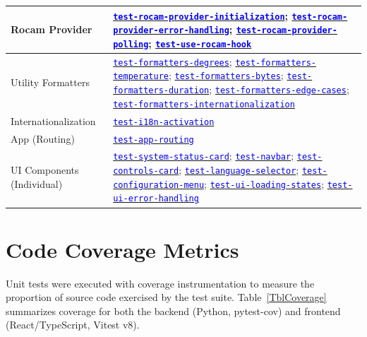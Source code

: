 \documentclass[12pt, titlepage]{article}
\newcommand{\tid}[1]{\hyperlink{tid:#1}{\textcolor{blue}{\texttt{#1}}}}
\begin{document}
\begin{table}[H]
\begin{tabularx}{\textwidth}{|p{4.5cm}|X|}
    \hline
    Rocam Provider             & \tid{test-rocam-provider-initialization}; \tid{test-rocam-provider-error-handling}; \tid{test-rocam-provider-polling}; \tid{test-use-rocam-hook}                                                            \\
    \hline
    Utility Formatters         & \tid{test-formatters-degrees}; \tid{test-formatters-temperature}; \tid{test-formatters-bytes}; \tid{test-formatters-duration}; \tid{test-formatters-edge-cases}; \tid{test-formatters-internationalization} \\
    \hline
    Internationalization       & \tid{test-i18n-activation}                                                                                                                                                                                  \\
    \hline
    App (Routing)              & \tid{test-app-routing}                                                                                                                                                                                      \\
    \hline
    UI Components (Individual) & \tid{test-system-status-card}; \tid{test-navbar}; \tid{test-controls-card}; \tid{test-language-selector}; \tid{test-configuration-menu}; \tid{test-ui-loading-states}; \tid{test-ui-error-handling}         \\
    \hline
  \end{tabularx}
  \normalsize
\end{table}

\section{Code Coverage Metrics}
\label{sec:coverage_metrics}

Unit tests were executed with coverage instrumentation to measure the
proportion of source code exercised by the test suite. Table~\ref{TblCoverage}
summarizes coverage for both the backend (Python, pytest-cov) and frontend
(React/TypeScript, Vitest v8).
\end{document}
